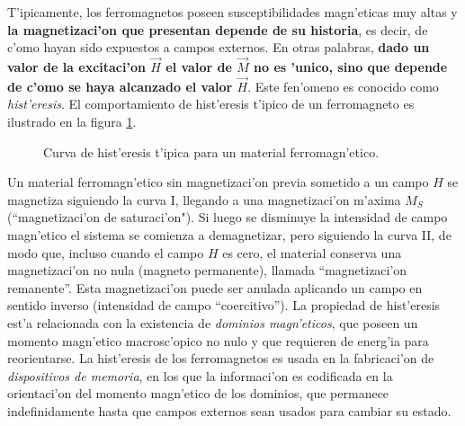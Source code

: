 T'ipicamente, los ferromagnetos poseen susceptibilidades
magn'eticas muy altas y \textbf{la magnetizaci'on que presentan depende de
su historia}, es decir, de c'omo hayan sido expuestos a campos externos. En
otras palabras, \textbf{dado un valor de la excitaci'on $\vec{H}$ el valor de $\vec{M}$
no es 'unico, sino que depende de c'omo se haya alcanzado el valor $\vec{H}$}.
Este fen'omeno es conocido como \textit{hist'eresis}. El comportamiento de
hist'eresis t'ipico de un ferromagneto es ilustrado en la figura
\ref{fig-histeresis}.
\begin{figure}[!h]
\centerline{}
\caption{Curva de hist'eresis t'ipica para un material ferromagn'etico.}
\label{fig-histeresis}
\end{figure}
Un material ferromagn'etico sin magnetizaci'on previa sometido a un campo $H$
se magnetiza siguiendo la curva I, llegando a una magnetizaci'on m'axima $M_S$ (``magnetizaci'on de saturaci'on"). 
Si luego se disminuye la intensidad de campo magn'etico el sistema se comienza
a demagnetizar, pero siguiendo la curva II, de modo que, incluso cuando el
campo $H$ es cero, el material conserva una magnetizaci'on no nula (magneto
permanente), llamada ``magnetizaci'on remanente''. Esta magnetizaci'on puede
ser anulada aplicando un campo en sentido inverso (intensidad de campo
``coercitivo''). La propiedad de hist'eresis est'a relacionada con la existencia
de \textit{dominios magn'eticos}, que poseen un momento magn'etico macrosc'opico
no nulo y que requieren de energ'ia para reorientarse. La hist'eresis de los
ferromagnetos es usada en la fabricaci'on de \textit{dispositivos de memoria}, en los
que la informaci'on es codificada en la orientaci'on del momento magn'etico de
los dominios, que permanece indefinidamente hasta que campos externos sean
usados para cambiar su estado.